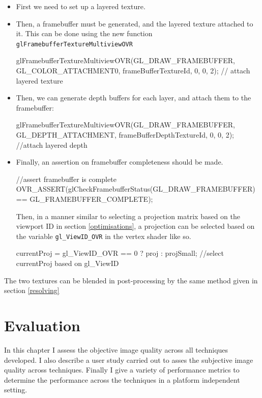 \documentclass[12pt,a4paper,twoside,openright]{report}
\begin{document}
\begin{itemize}

\item First we need to set up a layered texture.

\item Then, a framebuffer must be generated, and the layered texture attached to it. This can be done using the new function \texttt{glFramebufferTextureMultiviewOVR}
\begin{footcode}
glFramebufferTextureMultiviewOVR(GL_DRAW_FRAMEBUFFER, GL_COLOR_ATTACHMENT0,
				 frameBufferTextureId, 0, 0, 2); // attach layered texture
\end{footcode}
\item Then, we can generate depth buffers for each layer, and attach them to the framebuffer:
\begin{footcode}
glFramebufferTextureMultiviewOVR(GL_DRAW_FRAMEBUFFER, GL_DEPTH_ATTACHMENT,
				 frameBufferDepthTextureId, 0, 0, 2); //attach layered depth
\end{footcode}
\item Finally, an assertion on framebuffer completeness should be made.
\begin{footcode}
//assert framebuffer is complete
OVR_ASSERT(glCheckFramebufferStatus(GL_DRAW_FRAMEBUFFER) == GL_FRAMEBUFFER_COMPLETE);
\end{footcode}

Then, in a manner similar to selecting a projection matrix based on the viewport ID in section \ref{optimisations}, a projection can be selected based on the variable \texttt{gl\_ViewID\_OVR} in the vertex shader like so.

\begin{footcode}
currentProj = gl_ViewID_OVR == 0 ? proj : projSmall; //select currentProj based on gl_ViewID 
\end{footcode}

\end{itemize}

The two textures can be blended in post-processing by the same method given in section \ref{resolving}

\chapter{Evaluation}

In this chapter I assess the objective image quality across all techniques developed. I also describe a user study carried out to asses the subjective image quality across techniques. Finally I give a variety of performance metrics to determine the performance across the techniques in a platform independent setting.
\end{document}
